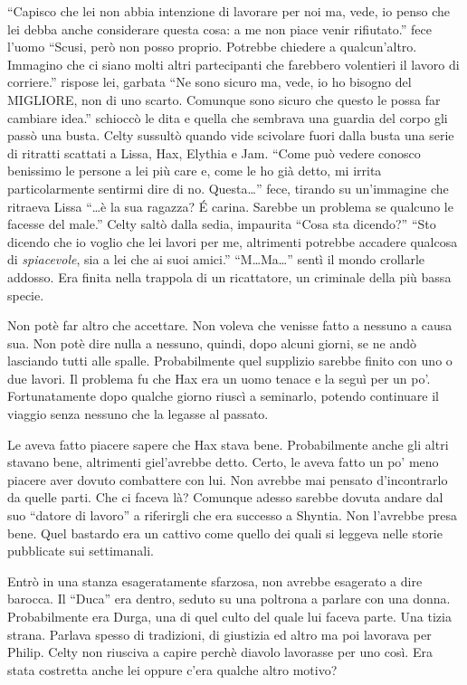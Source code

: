     ``Capisco che lei non abbia intenzione di lavorare per noi ma, vede, io
    penso che lei debba anche considerare questa cosa: a me non piace venir
    rifiutato.'' fece l'uomo ``Scusi, però non posso proprio. Potrebbe
    chiedere a qualcun'altro. Immagino che ci siano molti altri
    partecipanti che farebbero volentieri il lavoro di corriere.'' rispose
    lei, garbata ``Ne sono sicuro ma, vede, io ho bisogno del MIGLIORE, non
    di uno scarto. Comunque sono sicuro che questo le possa far cambiare
    idea.'' schioccò le dita e quella che sembrava una guardia del corpo
    gli passò una busta. Celty sussultò quando vide scivolare fuori dalla
    busta una serie di ritratti scattati a Lissa, Hax, Elythia e Jam.
    ``Come può vedere conosco benissimo le persone a lei più care e, come
    le ho già detto, mi irrita particolarmente sentirmi dire di no.
    Questa\dots{}'' fece, tirando su un'immagine che ritraeva Lissa
    ``\dots{}è la sua ragazza? \'E carina. Sarebbe un problema se qualcuno
    le facesse del male.'' Celty saltò dalla sedia, impaurita ``Cosa sta
    dicendo?'' ``Sto dicendo che io voglio che lei lavori per me,
    altrimenti potrebbe accadere qualcosa di \emph{spiacevole}, sia a lei
    che ai suoi amici.'' ``M\dots{}Ma\dots{}'' sentì il mondo crollarle
    addosso. Era finita nella trappola di un ricattatore, un criminale
    della più bassa specie.

    Non potè far altro che accettare. Non voleva che venisse fatto a
    nessuno a causa sua. Non potè dire nulla a nessuno, quindi, dopo alcuni
    giorni, se ne andò lasciando tutti alle spalle. Probabilmente quel
    supplizio sarebbe finito con uno o due lavori. Il problema fu che Hax
    era un uomo tenace e la seguì per un po'. Fortunatamente dopo qualche
    giorno riuscì a seminarlo, potendo continuare il viaggio senza nessuno
    che la legasse al passato.

    Le aveva fatto piacere sapere che Hax stava bene. Probabilmente anche
    gli altri stavano bene, altrimenti giel'avrebbe detto. Certo, le aveva
    fatto un po' meno piacere aver dovuto combattere con lui. Non avrebbe
    mai pensato d'incontrarlo da quelle parti. Che ci faceva là? Comunque
    adesso sarebbe dovuta andare dal suo ``datore di lavoro'' a riferirgli
    che era successo a Shyntia. Non l'avrebbe presa bene. Quel bastardo era
    un cattivo come quello dei quali si leggeva nelle storie pubblicate sui
    settimanali.

    Entrò in una stanza esageratamente sfarzosa, non avrebbe esagerato a
    dire barocca. Il ``Duca'' era dentro, seduto su una poltrona a parlare
    con una donna. Probabilmente era Durga, una di quel culto del quale
    lui faceva parte. Una tizia strana. Parlava spesso di tradizioni, di
    giustizia ed altro ma poi lavorava per Philip. Celty non riusciva a
    capire perchè diavolo lavorasse per uno così. Era stata costretta anche
    lei oppure c'era qualche altro motivo?

